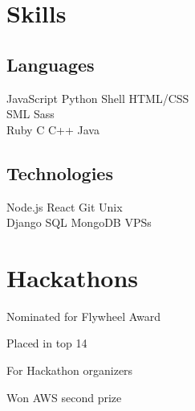 \documentclass[]{deedy-resume-openfont}
\begin{document}
\begin{minipage}[t]{0.33\textwidth}

\section{Skills}
\subsection{Languages}
JavaScript \textbullet{} Python \textbullet{} Shell \textbullet{}  HTML/CSS \\
SML \textbullet{} Sass \\
Ruby \textbullet{} C \textbullet{} C++ \textbullet{} Java \\
\sectionsep

\subsection{Technologies}
Node.js \textbullet{} React \textbullet{} Git \textbullet{} Unix \\
Django \textbullet{} SQL \textbullet{} MongoDB \textbullet{} VPSs
\sectionsep


\section{Hackathons}
\vspace{\topsep} %
\begin{tightemize}
\item Nominated for Flywheel Award
\end{tightemize}


\begin{tightemize}
\item Placed in top 14
\end{tightemize}


\begin{tightemize}
\item For Hackathon organizers
\end{tightemize}

\begin{tightemize}
\item Won AWS second prize
\end{tightemize}

\sectionsep

%
%

\end{minipage}
\end{document}
